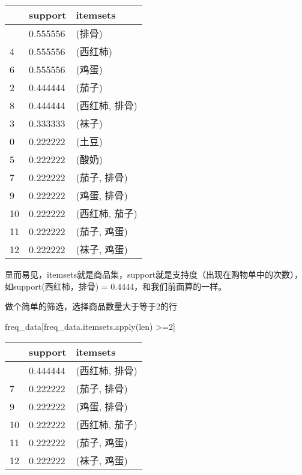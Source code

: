 \documentclass[
  letterpaper,
  DIV=11,
  numbers=noendperiod]{scrreprt}
\newenvironment{Shaded}{\begin{snugshade}}{\end{snugshade}}
\newcommand{\BuiltInTok}[1]{\textcolor[rgb]{0.00,0.23,0.31}{#1}}
\newcommand{\DecValTok}[1]{\textcolor[rgb]{0.68,0.00,0.00}{#1}}
\newcommand{\NormalTok}[1]{\textcolor[rgb]{0.00,0.23,0.31}{#1}}
\newcommand{\OperatorTok}[1]{\textcolor[rgb]{0.37,0.37,0.37}{#1}}
\begin{document}
\begin{longtable}[]{@{}lll@{}}
\toprule\noalign{}
& support & itemsets \\
\midrule\noalign{}
\endhead
\bottomrule\noalign{}
\endlastfoot
1 & 0.555556 & (排骨) \\
4 & 0.555556 & (西红柿) \\
6 & 0.555556 & (鸡蛋) \\
2 & 0.444444 & (茄子) \\
8 & 0.444444 & (西红柿, 排骨) \\
3 & 0.333333 & (袜子) \\
0 & 0.222222 & (土豆) \\
5 & 0.222222 & (酸奶) \\
7 & 0.222222 & (茄子, 排骨) \\
9 & 0.222222 & (鸡蛋, 排骨) \\
10 & 0.222222 & (西红柿, 茄子) \\
11 & 0.222222 & (茄子, 鸡蛋) \\
12 & 0.222222 & (袜子, 鸡蛋) \\
\end{longtable}

显而易见，itemsets就是商品集，support就是支持度（出现在购物单中的次数），如support(西红柿，排骨)
= 0.4444，和我们前面算的一样。

做个简单的筛选，选择商品数量大于等于2的行

\begin{Shaded}
\begin{Highlighting}[]
\NormalTok{freq\_data[freq\_data.itemsets.}\BuiltInTok{apply}\NormalTok{(}\BuiltInTok{len}\NormalTok{) }\OperatorTok{\textgreater{}=}\DecValTok{2}\NormalTok{]}
\end{Highlighting}
\end{Shaded}

\begin{longtable}[]{@{}lll@{}}
\toprule\noalign{}
& support & itemsets \\
\midrule\noalign{}
\endhead
\bottomrule\noalign{}
\endlastfoot
8 & 0.444444 & (西红柿, 排骨) \\
7 & 0.222222 & (茄子, 排骨) \\
9 & 0.222222 & (鸡蛋, 排骨) \\
10 & 0.222222 & (西红柿, 茄子) \\
11 & 0.222222 & (茄子, 鸡蛋) \\
12 & 0.222222 & (袜子, 鸡蛋) \\
\end{longtable}
\end{document}
